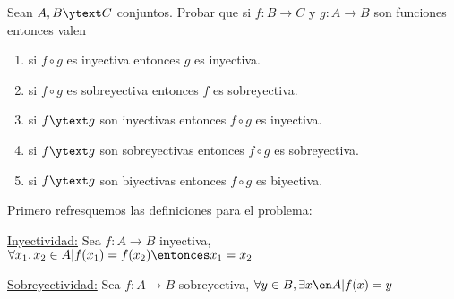 \begin{enunciado}{\ejercicio}
  Sean $A, B \ytext C$ conjuntos. Probar que si $f: B \to C$ y $g: A \to B$ son funciones entonces valen
  \begin{enumerate}[label=\roman*), itemsep = -5pt]
    \item si $f \circ g$ es inyectiva entonces $g$ es inyectiva.
    \item si $f \circ g$ es sobreyectiva entonces $f$ es sobreyectiva.
    \item si $f \ytext g$ son inyectivas entonces $f \circ g$ es inyectiva.
    \item si $f \ytext g$ son sobreyectivas entonces $f \circ g$ es sobreyectiva.
    \item si $f \ytext g$ son biyectivas entonces $f \circ g$ es biyectiva.
  \end{enumerate}
\end{enunciado}

Primero refresquemos las definiciones para el problema:

\underline{Inyectividad:} Sea $f:A \to B$ inyectiva,  $\forall x_1, x_2 \in A | f(x_1) = f(x_2) \entonces x_1 = x_2$ \vspace{0.25em}

\underline{Sobreyectividad:} Sea $f:A \to B$ sobreyectiva, $\forall y \in B, \exists x \en A | f(x) = y$ \vspace{0.25em}

